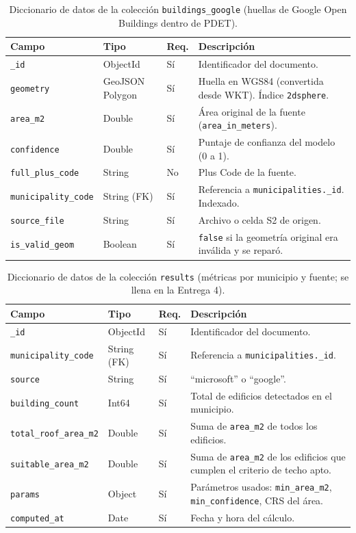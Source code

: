 \documentclass[11pt,letterpaper]{article}
\begin{document}
\begin{table}[!htbp]
\centering\small
\renewcommand{\arraystretch}{1.1}
\begin{tabular}{Y{0.23}Y{0.20}Y{0.07}Y{0.50}}
\toprule
Campo & Tipo & Req. & Descripción \\
\midrule
\texttt{\_id} & ObjectId & Sí & Identificador del documento. \\
\texttt{geometry} & GeoJSON Polygon & Sí & Huella en WGS84 (convertida desde WKT). Índice
  \texttt{2dsphere}. \\
\texttt{area\_m2} & Double & Sí & Área original de la fuente (\texttt{area\_in\_meters}). \\
\texttt{confidence} & Double & Sí & Puntaje de confianza del modelo (0 a 1). \\
\texttt{full\_plus\_code} & String & No & Plus Code de la fuente. \\
\texttt{municipality\_code} & String (FK) & Sí & Referencia a \texttt{municipalities.\_id}.
  Indexado. \\
\texttt{source\_file} & String & Sí & Archivo o celda S2 de origen. \\
\texttt{is\_valid\_geom} & Boolean & Sí & \texttt{false} si la geometría original era inválida y se
  reparó. \\
\bottomrule
\end{tabular}
\caption{Diccionario de datos de la colección \texttt{buildings\_google} (huellas de Google Open
Buildings dentro de PDET).}
\label{tab:dd-goog}
\end{table}

\begin{table}[!htbp]
\centering\small
\renewcommand{\arraystretch}{1.1}
\begin{tabular}{Y{0.23}Y{0.20}Y{0.07}Y{0.50}}
\toprule
Campo & Tipo & Req. & Descripción \\
\midrule
\texttt{\_id} & ObjectId & Sí & Identificador del documento. \\
\texttt{municipality\_code} & String (FK) & Sí & Referencia a \texttt{municipalities.\_id}. \\
\texttt{source} & String & Sí & ``microsoft'' o ``google''. \\
\texttt{building\_count} & Int64 & Sí & Total de edificios detectados en el municipio. \\
\texttt{total\_roof\_area\_m2} & Double & Sí & Suma de \texttt{area\_m2} de todos los edificios. \\
\texttt{suitable\_area\_m2} & Double & Sí & Suma de \texttt{area\_m2} de los edificios que cumplen el
  criterio de techo apto. \\
\texttt{params} & Object & Sí & Parámetros usados: \texttt{min\_area\_m2}, \texttt{min\_confidence},
  CRS del área. \\
\texttt{computed\_at} & Date & Sí & Fecha y hora del cálculo. \\
\bottomrule
\end{tabular}
\caption{Diccionario de datos de la colección \texttt{results} (métricas por municipio y fuente; se
llena en la Entrega 4).}
\label{tab:dd-res}
\end{table}
\end{document}
